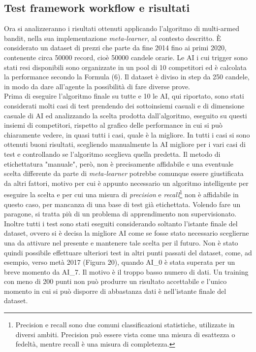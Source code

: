 \documentclass[a4paper,12pt]{report}
\begin{document}
\begin{fig}
\section{Test framework workflow e risultati}
Ora si analizzeranno i risultati ottenuti applicando l'algoritmo di multi-armed bandit, nella sua implementazione \textit{meta-learner}, al contesto descritto. È considerato un dataset di prezzi che parte da fine 2014 fino ai primi 2020, contenente circa 50000 record, cioè 50000 candele orarie. Le AI i cui trigger sono stati resi disponibili sono organizzate in un pool di 10 competitori ed è calcolata la performance secondo la Formula (6). Il dataset è diviso in step da 250 candele, in modo da dare all'agente la possibilità di fare diverse prove.\\ Prima di eseguire l'algoritmo finale su tutte e 10 le AI, qui riportato, sono stati considerati molti casi di test prendendo dei sottoinsiemi casuali e di dimensione casuale di AI ed analizzando la scelta prodotta dall'algoritmo, eseguito su questi insiemi di competitori, rispetto al grafico delle performance in cui si può chiaramente vedere, in quasi tutti i casi, quale è la migliore. In tutti i casi si sono ottenuti buoni risultati, scegliendo manualmente la AI migliore per i vari casi di test e controllando se l'algoritmo sceglieva quella predetta. Il metodo di etichettatura "manuale", però, non è precisamente affidabile e una eventuale scelta differente da parte di \textit{meta-learner} potrebbe comunque essere giustificata da altri fattori, motivo per cui è appunto necessario un algoritmo intelligente per eseguire la scelta e per cui una misura di \textit{precision} e \textit{recall}\footnote{Precision e recall sono due comuni classificazioni statistiche, utilizzate in diversi ambiti. Precision può essere vista come una misura di esattezza o fedeltà, mentre recall è una misura di completezza.} non è affidabile in questo caso, per mancanza di una base di test già etichettata. Volendo fare un paragone, si tratta più di un problema di apprendimento non supervisionato.\\Inoltre tutti i test sono stati eseguiti considerando soltanto l'istante finale del dataset, ovvero si è decisa la migliore AI come se fosse stato necessario sceglierne una da attivare nel presente e mantenere tale scelta per il futuro. Non è stato quindi possibile effettuare ulteriori test in altri punti passati del dataset, come, ad esempio, verso metà 2017 (Figura 20), quando AI\_0 è stata superata per un breve momento da AI\_7. Il motivo è il troppo basso numero di dati. Un training con meno di 200 punti non può produrre un risultato accettabile e l'unico momento in cui si può disporre di abbastanza dati è nell'istante finale del dataset.

\end{fig}
\end{document}
